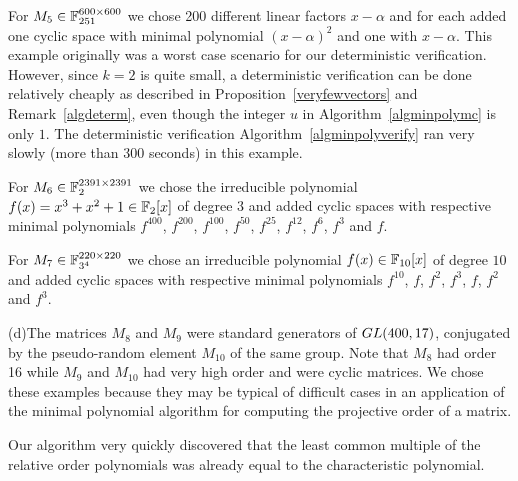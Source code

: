 For $M_5 \in \mathbb{F}_{251}^{600 \times 600}$ we chose 200 different linear
factors $x-\alpha$ and for each added one cyclic space with minimal polynomial
$(x-\alpha)^2$ and one with $x-\alpha$. This example originally was a
worst case scenario for our deterministic verification. However, since $k=2$ is 
%
quite small, a deterministic verification can be done relatively
cheaply as described in Proposition~\ref{veryfewvectors} and
Remark~\ref{algdeterm}, even though the integer $u$ in
Algorithm~\ref{algminpolymc} is only $1$. The deterministic
verification Algorithm~\ref{algminpolyverify} ran very slowly 
(more than 300 seconds) in this example.

For $M_6 \in \mathbb{F}_2^{2391 \times 2391}$ we chose the irreducible polynomial
$f(x) = x^3+x^2+1 \in \mathbb{F}_2[x]$ of degree $3$ and added cyclic spaces with 
respective minimal polynomials $f^{400}$, $f^{200}$, $f^{100}$,
$f^{50}$, $f^{25}$, $f^{12}$, $f^6$, $f^3$ and $f$.

For $M_7 \in \mathbb{F}_{3^4}^{220 \times 220}$ we chose an irreducible polynomial
$f(x) \in \mathbb{F}_{10}[x]$ of degree $10$ and added cyclic spaces with
respective minimal polynomials $f^{10}$, $f$, $f^2$, $f^3$, $f$, $f^2$ and
$f^3$.

\pagebreak
(d)\quad The matrices $M_8$ and $M_9$ were standard generators of 
${\rm GL}(400,17)$, 
conjugated by the pseu\-do-ran\-dom element $M_{10}$ of the same group.
Note that $M_8$ had
order 16 while $M_9$ and $M_{10}$ had very high order and were cyclic 
matrices. We chose these examples because they may be typical of 
difficult cases in an application of the minimal polynomial algorithm
for computing the projective order of a matrix. 

Our algorithm %
very quickly discovered that the least common multiple of the relative order
polynomials was already equal to the characteristic polynomial.

